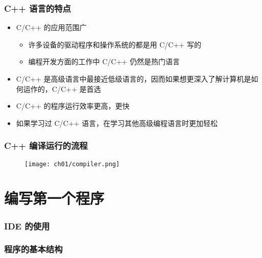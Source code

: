 \begin{frame}[fragile]
    \frametitle{C++ 语言的特点}

    \begin{itemize}
        \item<1-> C/C++ 的应用范围广

            \begin{itemize}
                \item 许多设备的驱动程序和操作系统的都是用 C/C++ 写的
                \item 编程开发方面的工作中 C/C++ 仍然是热门语言
            \end{itemize}

        \item<2-> C/C++ 是高级语言中最接近低级语言的，因而如果想更深入了解计算机是如何运作的，C/C++ 是首选

        \item<3-> C/C++ 的程序运行效率更高，更快

        \item<4-> 如果学习过 C/C++ 语言，在学习其他高级编程语言时更加轻松
    \end{itemize}
\end{frame}

\begin{frame}[fragile]
    \frametitle{C++ 编译运行的流程}

    \begin{figure}
        \texttt{[image: ch01/compiler.png]}
    \end{figure}
\end{frame}


\section{编写第一个程序}

\begin{frame}[fragile]
    \frametitle{IDE 的使用}

\end{frame}

\begin{frame}[fragile]
    \frametitle{程序的基本结构}

     {
        
    }{
        
    }
\end{frame}


